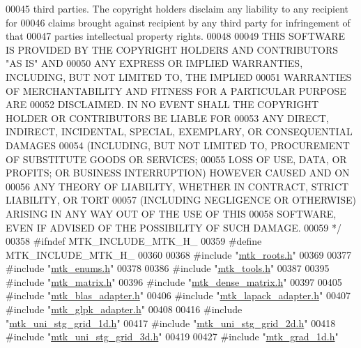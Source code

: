 \begin{DoxyCode}
00045 \textcolor{comment}{third parties. The copyright holders disclaim any liability to any recipient for}
00046 \textcolor{comment}{claims brought against recipient by any third party for infringement of that}
00047 \textcolor{comment}{parties intellectual property rights.}
00048 \textcolor{comment}{}
00049 \textcolor{comment}{THIS SOFTWARE IS PROVIDED BY THE COPYRIGHT HOLDERS AND CONTRIBUTORS "AS IS" AND}
00050 \textcolor{comment}{ANY EXPRESS OR IMPLIED WARRANTIES, INCLUDING, BUT NOT LIMITED TO, THE IMPLIED}
00051 \textcolor{comment}{WARRANTIES OF MERCHANTABILITY AND FITNESS FOR A PARTICULAR PURPOSE ARE}
00052 \textcolor{comment}{DISCLAIMED. IN NO EVENT SHALL THE COPYRIGHT HOLDER OR CONTRIBUTORS BE LIABLE FOR}
00053 \textcolor{comment}{ANY DIRECT, INDIRECT, INCIDENTAL, SPECIAL, EXEMPLARY, OR CONSEQUENTIAL DAMAGES}
00054 \textcolor{comment}{(INCLUDING, BUT NOT LIMITED TO, PROCUREMENT OF SUBSTITUTE GOODS OR SERVICES;}
00055 \textcolor{comment}{LOSS OF USE, DATA, OR PROFITS; OR BUSINESS INTERRUPTION) HOWEVER CAUSED AND ON}
00056 \textcolor{comment}{ANY THEORY OF LIABILITY, WHETHER IN CONTRACT, STRICT LIABILITY, OR TORT}
00057 \textcolor{comment}{(INCLUDING NEGLIGENCE OR OTHERWISE) ARISING IN ANY WAY OUT OF THE USE OF THIS}
00058 \textcolor{comment}{SOFTWARE, EVEN IF ADVISED OF THE POSSIBILITY OF SUCH DAMAGE.}
00059 \textcolor{comment}{*/}
00358 \textcolor{preprocessor}{#ifndef MTK\_INCLUDE\_MTK\_H\_}
00359 \textcolor{preprocessor}{#define MTK\_INCLUDE\_MTK\_H\_}
00360 
00368 \textcolor{preprocessor}{#include "\hyperlink{mtk__roots_8h}{mtk\_roots.h}"}
00369 
00377 \textcolor{preprocessor}{#include "\hyperlink{mtk__enums_8h}{mtk\_enums.h}"}
00378 
00386 \textcolor{preprocessor}{#include "\hyperlink{mtk__tools_8h}{mtk\_tools.h}"}
00387 
00395 \textcolor{preprocessor}{#include "\hyperlink{mtk__matrix_8h}{mtk\_matrix.h}"}
00396 \textcolor{preprocessor}{#include "\hyperlink{mtk__dense__matrix_8h}{mtk\_dense\_matrix.h}"}
00397 
00405 \textcolor{preprocessor}{#include "\hyperlink{mtk__blas__adapter_8h}{mtk\_blas\_adapter.h}"}
00406 \textcolor{preprocessor}{#include "\hyperlink{mtk__lapack__adapter_8h}{mtk\_lapack\_adapter.h}"}
00407 \textcolor{preprocessor}{#include "\hyperlink{mtk__glpk__adapter_8h}{mtk\_glpk\_adapter.h}"}
00408 
00416 \textcolor{preprocessor}{#include "\hyperlink{mtk__uni__stg__grid__1d_8h}{mtk\_uni\_stg\_grid\_1d.h}"}
00417 \textcolor{preprocessor}{#include "\hyperlink{mtk__uni__stg__grid__2d_8h}{mtk\_uni\_stg\_grid\_2d.h}"}
00418 \textcolor{preprocessor}{#include "\hyperlink{mtk__uni__stg__grid__3d_8h}{mtk\_uni\_stg\_grid\_3d.h}"}
00419 
00427 \textcolor{preprocessor}{#include "\hyperlink{mtk__grad__1d_8h}{mtk\_grad\_1d.h}"}

\end{DoxyCode}
